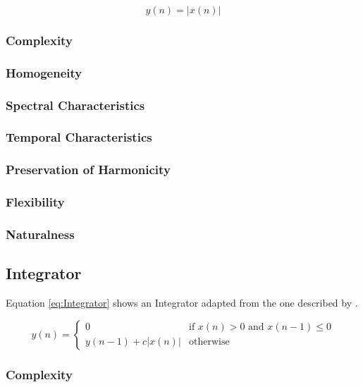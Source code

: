 		\begin{equation}
			y(n) = |x(n)|
			\label{eq:FullWaveRectification}
		\end{equation}

		\subsubsection*{Complexity}
		\subsubsection*{Homogeneity}
		\subsubsection*{Spectral Characteristics}
		\subsubsection*{Temporal Characteristics}
		\subsubsection*{Preservation of Harmonicity}
		\subsubsection*{Flexibility}
		\subsubsection*{Naturalness}

	\subsection{Integrator}
	\label{sec:Excitation-Integrator}
		Equation \ref{eq:Integrator} shows an Integrator adapted from the one described by \citet{larsen2004audio}.

		\begin{equation}
			y(n) = \begin{cases}
				0 & \text{if $x(n) > 0$ and $x(n - 1) \leq 0$} \\
				y(n - 1) + c|x(n)| & \text{otherwise}
			\end{cases}
			\label{eq:Integrator}
		\end{equation}

		\subsubsection*{Complexity}
